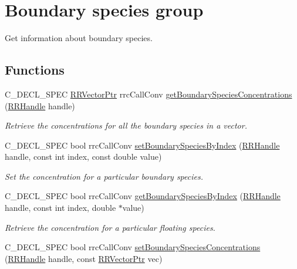 \hypertarget{group__boundary}{}\section{Boundary species group}
\label{group__boundary}


Get information about boundary species.  


\subsection*{Functions}
\begin{DoxyCompactItemize}
\item 
C\+\_\+\+D\+E\+C\+L\+\_\+\+S\+P\+E\+C \hyperlink{rrc__types_8h_a3be72d6006034fd349f753d2bf441bf7}{R\+R\+Vector\+Ptr} rrc\+Call\+Conv \hyperlink{group__boundary_gaa36e026ba8f7488c7a57e96c0471763b}{get\+Boundary\+Species\+Concentrations} (\hyperlink{rrc__types_8h_a1d68f0592372208fa5a5f2799ea4b3ae}{R\+R\+Handle} handle)
\begin{DoxyCompactList}\small\item\em Retrieve the concentrations for all the boundary species in a vector. \end{DoxyCompactList}\item 
C\+\_\+\+D\+E\+C\+L\+\_\+\+S\+P\+E\+C bool rrc\+Call\+Conv \hyperlink{group__boundary_gadf834c3d92ac79a778dfcd5d97d3e340}{set\+Boundary\+Species\+By\+Index} (\hyperlink{rrc__types_8h_a1d68f0592372208fa5a5f2799ea4b3ae}{R\+R\+Handle} handle, const int index, const double value)
\begin{DoxyCompactList}\small\item\em Set the concentration for a particular boundary species. \end{DoxyCompactList}\item 
C\+\_\+\+D\+E\+C\+L\+\_\+\+S\+P\+E\+C bool rrc\+Call\+Conv \hyperlink{group__boundary_ga5bdb50a2653fc268731aaba05d7b7377}{get\+Boundary\+Species\+By\+Index} (\hyperlink{rrc__types_8h_a1d68f0592372208fa5a5f2799ea4b3ae}{R\+R\+Handle} handle, const int index, double $\ast$value)
\begin{DoxyCompactList}\small\item\em Retrieve the concentration for a particular floating species. \end{DoxyCompactList}\item 
C\+\_\+\+D\+E\+C\+L\+\_\+\+S\+P\+E\+C bool rrc\+Call\+Conv \hyperlink{group__boundary_gacc067866a08d07a196d681328b5b3e38}{set\+Boundary\+Species\+Concentrations} (\hyperlink{rrc__types_8h_a1d68f0592372208fa5a5f2799ea4b3ae}{R\+R\+Handle} handle, const \hyperlink{rrc__types_8h_a3be72d6006034fd349f753d2bf441bf7}{R\+R\+Vector\+Ptr} vec)

\end{DoxyCompactItemize}
